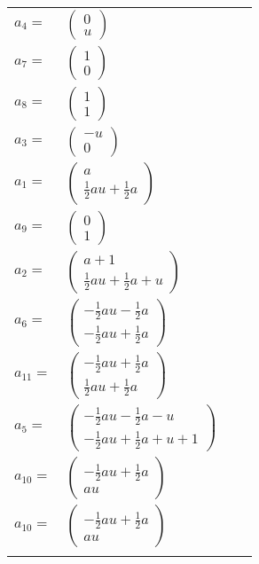 \documentclass[1p]{elsarticle_modified}
\theoremstyle{definition}
\begin{document}
\begin{tabular}{m{7pt} m{180pt} m{7pt} m{180pt} }
\flushright $a_{4}=$&$\begin{pmatrix}0\\u\end{pmatrix}$ \\
\flushright $a_{7}=$&$\begin{pmatrix}1\\0\end{pmatrix}$ \\
\flushright $a_{8}=$&$\begin{pmatrix}1\\1\end{pmatrix}$ \\
\flushright $a_{3}=$&$\begin{pmatrix}- u\\0\end{pmatrix}$ \\
\flushright $a_{1}=$&$\begin{pmatrix}a\\\frac{1}{2} a u+\frac{1}{2} a\end{pmatrix}$ \\
\flushright $a_{9}=$&$\begin{pmatrix}0\\1\end{pmatrix}$ \\
\flushright $a_{2}=$&$\begin{pmatrix}a+1\\\frac{1}{2} a u+\frac{1}{2} a+u\end{pmatrix}$ \\
\flushright $a_{6}=$&$\begin{pmatrix}-\frac{1}{2} a u-\frac{1}{2} a\\-\frac{1}{2} a u+\frac{1}{2} a\end{pmatrix}$ \\
\flushright $a_{11}=$&$\begin{pmatrix}-\frac{1}{2} a u+\frac{1}{2} a\\\frac{1}{2} a u+\frac{1}{2} a\end{pmatrix}$ \\
\flushright $a_{5}=$&$\begin{pmatrix}-\frac{1}{2} a u-\frac{1}{2} a- u\\-\frac{1}{2} a u+\frac{1}{2} a+u+1\end{pmatrix}$ \\
\flushright $a_{10}=$&$\begin{pmatrix}-\frac{1}{2} a u+\frac{1}{2} a\\a u\end{pmatrix}$\\ \flushright $a_{10}=$&$\begin{pmatrix}-\frac{1}{2} a u+\frac{1}{2} a\\a u\end{pmatrix}$\\&\end{tabular}
\end{document}
